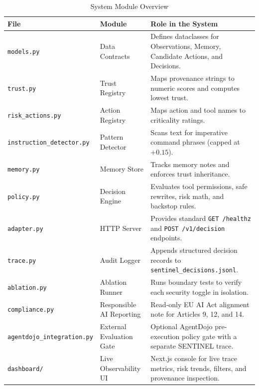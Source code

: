 \documentclass[11pt,a4paper]{article}
\begin{document}
\begin{table}[ht]
\centering
\small
\begin{tabularx}{\textwidth}{l p{3.8cm} X}
\toprule
\textbf{File} & \textbf{Module} & \textbf{Role in the System} \\
\midrule
\texttt{models.py} & Data Contracts & Defines dataclasses for Observations, Memory, Candidate Actions, and Decisions. \\
\texttt{trust.py} & Trust Registry & Maps provenance strings to numeric scores and computes lowest trust. \\
\texttt{risk\_actions.py} & Action Registry & Maps action and tool names to criticality ratings. \\
\texttt{instruction\_detector.py} & Pattern Detector & Scans text for imperative command phrases (capped at $+0.15$). \\
\texttt{memory.py} & Memory Store & Tracks memory notes and enforces trust inheritance. \\
\texttt{policy.py} & Decision Engine & Evaluates tool permissions, safe rewrites, risk math, and backstop rules. \\
\texttt{adapter.py} & HTTP Server & Provides standard \texttt{GET /healthz} and \texttt{POST /v1/decision} endpoints. \\
\texttt{trace.py} & Audit Logger & Appends structured decision records to \texttt{sentinel\_decisions.jsonl}. \\
\texttt{ablation.py} & Ablation Runner & Runs boundary tests to verify each security toggle in isolation. \\
\texttt{compliance.py} & Responsible AI Reporting & Read-only EU AI Act alignment note for Articles 9, 12, and 14. \\
\texttt{agentdojo\_integration.py} & External Evaluation Gate & Optional AgentDojo pre-execution policy gate with a separate SENTINEL trace. \\
\texttt{dashboard/} & Live Observability UI & Next.js console for live trace metrics, risk trends, filters, and provenance inspection. \\
\bottomrule
\end{tabularx}
\caption{System Module Overview}
\end{table}
\end{document}
